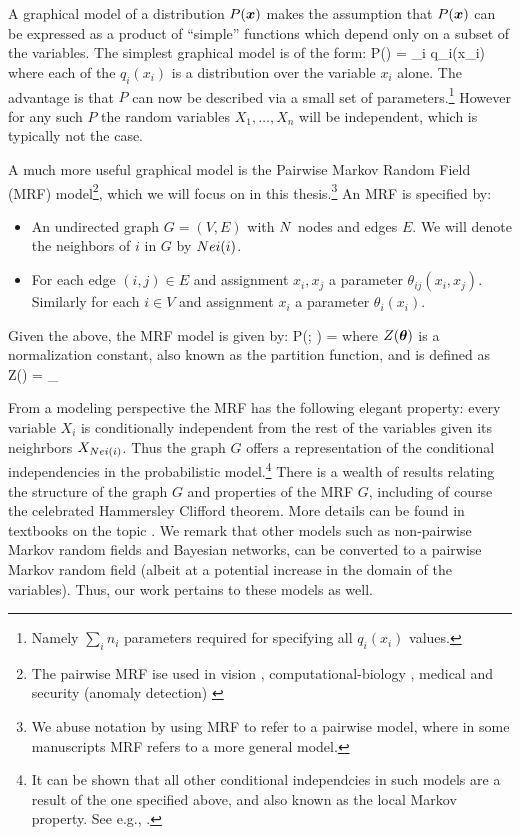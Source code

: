 A graphical model of a distribution $P(\boldsymbol{x})$ makes the assumption that $P(\boldsymbol{x})$ can be expressed as a product of ``simple'' functions which depend only on a subset of the variables. The simplest graphical model is of the form:
\be
P(\xx) = \prod_i q_i(x_i)
\label{eq:independent}
\ee
where each of the $q_i(x_i)$ is a distribution over the variable $x_i$ alone. The advantage is that $P$ can now be described via a small set of parameters.\footnote{Namely $\sum_i n_i$ parameters required for specifying all $q_i(x_i)$ values.} However for any such $P$ the random variables $X_1,\ldots,X_n$ will be independent, which is typically not the case.

A much more useful graphical model is the Pairwise Markov Random Field (MRF) model\footnote{The pairwise MRF ise used in vision \cite{yao2010modeling}, computational-biology \cite{hopf2015quantification}, medical \cite{goodwin2015predictive} and security (anomaly detection) \cite{wang2015ddos}}, which we will focus on in this thesis.\footnote{We abuse notation by using MRF to refer to a pairwise model, where in some manuscripts MRF refers to a more general model.} An MRF is specified by:
\begin{itemize}
\item An undirected graph $G=(V,E)$ with $N$ nodes and edges $E$. We will denote the neighbors of $i$ in $G$ by $Nei(i)$.
\item For each edge $(i,j)\in E$ and assignment $x_i,x_j$ a parameter $\theta_{ij}(x_i,x_j)$. Similarly for each $i\in V$ and assignment $x_i$ a parameter $\theta_i(x_i)$. 
\end{itemize}  

Given the above, the MRF model is given by:
\be
\label{eq:basic_model}
P(\xx; \thetav) =  
\ee
where $Z(\boldsymbol{\theta})$ is a normalization constant, also known as the partition function, and is defined as 
\be
\label{eq:partition_function}
Z(\thetav) = \sum_{\xx \in\cX}
\ee

From a modeling perspective the MRF has the following elegant property: every variable $X_i$ is conditionally independent from the rest of the variables given its neighrbors $X_{Nei(i)}$. Thus the graph $G$ offers a representation of the conditional independencies in the probabilistic model.\footnote{It can be shown that all other conditional independcies in such models are a result of the one specified above, and also known as the local Markov property. See e.g.,  \cite{koller2009probabilistic}.} There is a wealth of results relating the structure of the graph $G$ and properties of the MRF $G$, including of course the celebrated Hammersley Clifford theorem. More details can be found in textbooks on the topic  \cite{koller2009probabilistic}. We remark that other models such as non-pairwise Markov random fields and Bayesian networks, can be converted to a pairwise Markov random field (albeit at a potential increase in the domain of the variables). Thus, our work pertains to these models as well.

